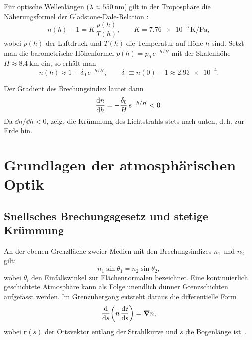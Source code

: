 ﻿\documentclass[12pt,a4paper]{article}
\begin{document}
Für optische Wellenlängen ($\lambda \approx \SI{550}{\nano\metre}$)
gilt in der Troposphäre die Näherungsformel der Gladstone-Dale-Relation
\citep{PenndorfRefractivity1957}:
\begin{equation}
  n(h) - 1 = K \, \frac{p(h)}{T(h)},
  \qquad
  K = \SI{7.76e-5}{\kelvin\per\pascal},
  \label{eq:gladstone_dale}
\end{equation}
wobei $p(h)$ der Luftdruck und $T(h)$ die Temperatur auf Höhe $h$ sind.
Setzt man die barometrische Höhenformel
$p(h) = p_0\,e^{-h/H}$ mit der Skalenhöhe
$H \approx \SI{8.4}{\kilo\metre}$ ein, so erhält man
\begin{equation}
  n(h) \approx 1 + \delta_0\,e^{-h/H},
  \qquad
  \delta_0 \equiv n(0)-1 \approx \num{2.93e-4}.
  \label{eq:n_exp}
\end{equation}

Der Gradient des Brechungsindex lautet dann
\begin{equation}
  \dv{n}{h} = -\frac{\delta_0}{H}\,e^{-h/H} < 0.
  \label{eq:gradient_n}
\end{equation}
Da $\dd n/\dd h < 0$, zeigt die Krümmung des Lichtstrahls
stets nach unten, d.\,h. zur Erde hin.

\section{Grundlagen der atmosphärischen Optik}
\label{sec:grundlagen}

\subsection{Snellsches Brechungsgesetz und stetige Krümmung}

An der ebenen Grenzfläche zweier Medien mit den
Brechungsindizes $n_1$ und $n_2$ gilt:
\begin{equation}
  n_1 \sin\theta_1 = n_2 \sin\theta_2,
  \label{eq:snell}
\end{equation}
wobei $\theta_i$ den Einfallswinkel zur Flächennormalen bezeichnet.
Eine kontinuierlich geschichtete Atmosphäre kann als
Folge unendlich dünner Grenzschichten aufgefasst werden.
Im Grenzübergang entsteht daraus die differentielle Form
\begin{equation}
  \dv{}{s}\!\left(n\,\dv{\mathbf{r}}{s}\right) = \grad n,
  \label{eq:strahlgleichung_allg}
\end{equation}
wobei $\mathbf{r}(s)$ der Ortsvektor entlang der Strahlkurve
und $s$ die Bogenlänge ist~\citep{BornWolf1999}.
\end{document}
